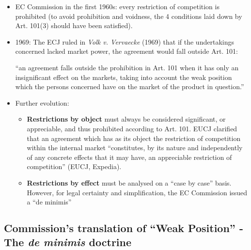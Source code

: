         \begin{itemize}
            \item EC Commission in the first 1960s: every restriction of competition is prohibited (to avoid prohibition and voidness, the 4 conditions laid down by Art. 101(3) should have been satisfied).
            \item 1969: The ECJ ruled in \textit{Volk v. Vervaecke} (1969) that if the undertakings concerned lacked market power, the agreement would fall outside Art. 101:
            
            “an agreement falls outside the prohibition in Art. 101 when it has only an insignificant effect on the markets, taking into account the weak position which the persons concerned have on the market of the product in question.”

            \item Further evolution:
                \begin{itemize}
                    \item \textbf{Restrictions by object} must always be considered significant, or appreciable, and thus prohibited according to Art. 101. EUCJ clarified that an agreement which has as its object the restriction of competition within the internal market “constitutes, by its nature and independently of any concrete effects that it may have, an appreciable restriction of competition” (EUCJ, Expedia).
                    \item \textbf{Restrictions by effect} must be analysed on a “case by case” basis. However, for legal certainty and simplification, the EC Commission issued a “de minimis”
                \end{itemize}
        \end{itemize}

\newpage
    \subsection{Commission’s translation of “Weak Position” - The \textit{de minimis} doctrine}


